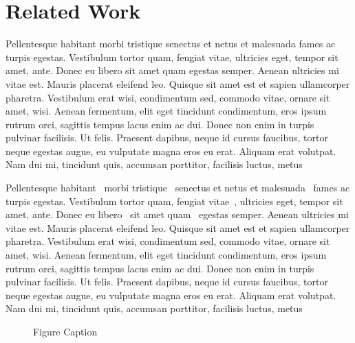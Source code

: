 
\chapter{Related Work}\label{sec:related}
Pellentesque habitant morbi tristique senectus et netus et malesuada fames ac turpis egestas. Vestibulum tortor quam, feugiat vitae, ultricies eget, tempor sit amet, ante. Donec eu libero sit amet quam egestas semper. Aenean ultricies mi vitae est. Mauris placerat eleifend leo. Quisque sit amet est et sapien ullamcorper pharetra. Vestibulum erat wisi, condimentum sed, commodo vitae, ornare sit amet, wisi. Aenean fermentum, elit eget tincidunt condimentum, eros ipsum rutrum orci, sagittis tempus lacus enim ac dui. Donec non enim in turpis pulvinar facilisis. Ut felis. Praesent dapibus, neque id cursus faucibus, tortor neque egestas augue, eu vulputate magna eros eu erat. Aliquam erat volutpat. Nam dui mi, tincidunt quis, accumsan porttitor, facilisis luctus, metus

Pellentesque habitant~\cite{8094140, 7157818, 8416424, 8406200} morbi tristique~\cite{8094140} senectus et netus et malesuada~\cite{7157818} fames ac turpis egestas. Vestibulum\cite{181294} tortor quam, feugiat vitae~\cite{8416424}, ultricies eget\cite{8406200}, tempor sit amet, ante\cite{Chen-ASD}. Donec eu libero~\cite{7876241,181294} sit amet quam~\cite{7876241} egestas semper. Aenean\cite{7979979} ultricies mi vitae est. Mauris placerat eleifend leo. Quisque\cite{7899588} sit amet est et sapien ullamcorper\cite{Mu-AAAS} pharetra. Vestibulum erat wisi, condimentum sed\cite{7899588}, commodo vitae, ornare sit amet, wisi. Aenean fermentum, elit eget tincidunt condimentum, eros ipsum rutrum orci, sagittis tempus lacus enim ac dui. Donec non enim in turpis pulvinar facilisis. Ut felis. Praesent dapibus, neque id cursus faucibus, tortor neque egestas augue, eu vulputate magna eros eu erat. Aliquam erat volutpat. Nam dui mi, tincidunt quis, accumsan porttitor, facilisis luctus, metus

\begin{figure}[t!]
	\centering
	\caption{Figure Caption}
	\label{fig:fig3}
\end{figure}